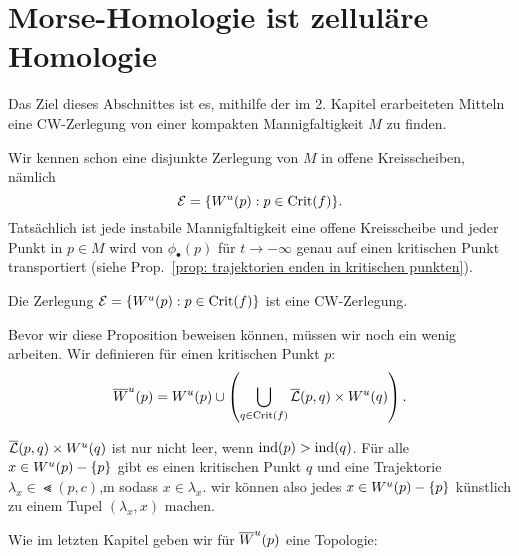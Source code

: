 \section{Morse-Homologie ist zelluläre Homologie}

Das Ziel dieses Abschnittes ist es, mithilfe der im 2. Kapitel erarbeiteten Mitteln eine 
CW-Zerlegung von einer kompakten Mannigfaltigkeit $M$ zu finden.

Wir kennen schon eine disjunkte Zerlegung von $M$ in offene Kreisscheiben, nämlich
\[ \mathcal{E} = \{ { W^u } (p): p \in { \operatorname{Crit} } (f) \} . \]
Tatsächlich ist jede instabile Mannigfaltigkeit eine offene Kreisscheibe und jeder Punkt in 
$ p \in M$ wird von $\phi_{\bullet}(p)$ für $t \to - \infty$ genau auf einen kritischen Punkt 
transportiert (siehe Prop.~\ref{prop: trajektorien enden in kritischen punkten}).

\begin{prop}
    \label{prop: cw-zerlegung}
    Die Zerlegung $\mathcal{E} = \{ { W^u } (p): p \in { \operatorname{Crit} } (f) \}$ ist eine CW-Zerlegung.
\end{prop}

Bevor wir diese Proposition beweisen können, müssen wir noch ein wenig arbeiten.
Wir definieren für einen kritischen Punkt $p$:
\[ { \overline{W}^u } (p) = 
    { W^u } (p) \cup \left( \bigcup_{q \in { \operatorname{Crit} } (f)} {\overline{\mathcal{L}} } (p, q) \times { W^u } (q) \right) . \]

${\overline{\mathcal{L}} } (p, q) \times { W^u } (q)$ ist nur nicht leer, wenn ${ \operatorname{ind} } (p) > { \operatorname{ind} } (q)$.
Für alle $x \in { W^u } (p) - \{ p \}$ gibt es einen kritischen Punkt $q$ und eine Trajektorie 
$\lambda_x \in \Lt (p, c)$,m sodass $x \in \lambda_x$. wir können also jedes 
$x \in { W^u } (p) - \{ p \}$ künstlich zu einem Tupel $(\lambda_x, x)$ machen. 

Wie im letzten Kapitel geben wir für ${ \overline{W}^u } (p)$ eine Topologie:


